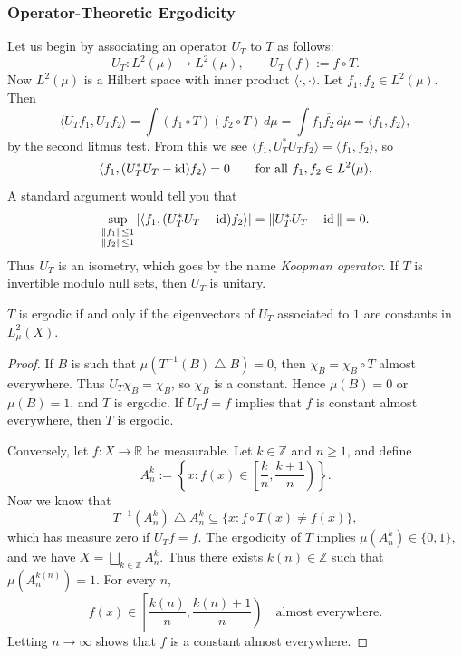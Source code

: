 \documentclass[11pt,a4paper]{article}
\begin{document}
\subsubsection{Operator-Theoretic Ergodicity}
Let us begin by associating an operator $U_T$ to $T$ as follows:
\[
  U_T\colon L^2(\mu)\longrightarrow L^2(\mu),\qquad U_T(f):=f\circ T.
\]
Now $L^2(\mu)$ is a Hilbert space with inner product $\langle\cdot,\cdot\rangle$.
Let $f_1,f_2\in L^2(\mu)$. Then
\[
  \langle U_Tf_1,U_Tf_2\rangle
  =\int(f_1\circ T)\overline{(f_2\circ T)}\,d\mu
  =\int f_1\overline{f_2}\,d\mu=\langle f_1,f_2\rangle,
\]
by the second litmus test. From this we see
$\langle f_1,U_T^*U_Tf_2\rangle=\langle f_1,f_2\rangle$, so
\[
  \langle f_1,(U_T^*U_T-\operatorname{id})f_2\rangle=0
  \qquad\text{for all }f_1,f_2\in L^2(\mu).
\]
A standard argument
would tell you that
\[
  \sup_{\substack{\|f_1\|\leq1\\\|f_2\|\leq1}}
  \left|\langle f_1,(U_T^*U_T-\operatorname{id})f_2\rangle\right|
  =\|U_T^*U_T-\operatorname{id}\|=0.
\]
Thus $U_T$ is an isometry, which goes by the name \emph{Koopman operator}. If
$T$ is invertible modulo null sets, then $U_T$ is unitary.

\setcounter{theorem}{6}\begin{proposition}\label{prop:ergodicity-operator}
$T$ is ergodic if and only if the eigenvectors of $U_T$ associated to $1$ are
constants in $L^2_\mu(X)$.
\end{proposition}
\begin{proof}
If $B$ is such that $\mu(T^{-1}(B)\mathbin\triangle B)=0$, then
$\chi_B=\chi_B\circ T$ almost everywhere. Thus $U_T\chi_B=\chi_B$, so $\chi_B$
is a constant. Hence $\mu(B)=0$ or $\mu(B)=1$, and $T$ is ergodic.
If $U_Tf=f$ implies that $f$ is constant almost everywhere, then $T$ is ergodic.

Conversely, let $f\colon X\to\mathbb R$ be measurable. Let $k\in\mathbb Z$
and $n\geq1$, and define
\[
  A_n^k:=\left\{x:f(x)\in\left[\frac{k}{n},\frac{k+1}{n}\right)\right\}.
\]
Now we know that
\[
  T^{-1}(A_n^k)\mathbin\triangle A_n^k
  \subseteq\{x:f\circ T(x)\neq f(x)\},
\]
which has measure zero if $U_Tf=f$. The ergodicity of $T$ implies
$\mu(A_n^k)\in\{0,1\}$, and we have $X=\bigsqcup_{k\in\mathbb Z}A_n^k$.
Thus there exists $k(n)\in\mathbb Z$ such that $\mu(A_n^{k(n)})=1$.
For every $n$,
\[
  f(x)\in\left[\frac{k(n)}{n},\frac{k(n)+1}{n}\right)
  \quad\text{almost everywhere}.
\]
Letting $n\to\infty$ shows that $f$ is a constant almost everywhere.
\end{proof}
\end{document}
